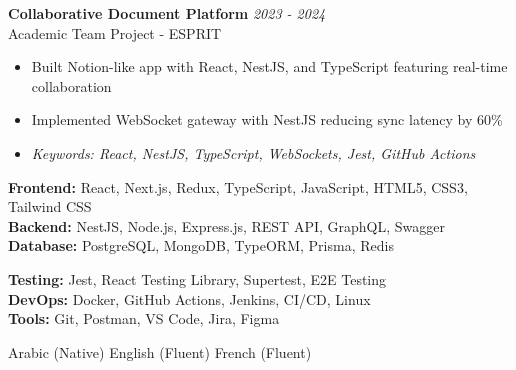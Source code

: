 \documentclass[11pt,a4paper]{article}
\begin{document}

\textbf{Collaborative Document Platform} \hfill \textit{2023 - 2024}\\[-2pt]
Academic Team Project - ESPRIT\\[-5pt]
\begin{itemize}[leftmargin=8pt,itemsep=1pt,topsep=2pt]
  \item Built Notion-like app with React, NestJS, and TypeScript featuring real-time collaboration
  \item Implemented WebSocket gateway with NestJS reducing sync latency by 60\%
  \item[] \textit{\footnotesize Keywords: React, NestJS, TypeScript, WebSockets, Jest, GitHub Actions}
\end{itemize}\vspace{3pt}

{\small
\begin{minipage}[t]{0.48\textwidth}
  \textbf{Frontend:} React, Next.js, Redux, TypeScript, JavaScript, HTML5, CSS3, Tailwind CSS\\[1.5pt]
  \textbf{Backend:} NestJS, Node.js, Express.js, REST API, GraphQL, Swagger\\[1.5pt]
  \textbf{Database:} PostgreSQL, MongoDB, TypeORM, Prisma, Redis
\end{minipage}
\hfill
\begin{minipage}[t]{0.48\textwidth}
  \textbf{Testing:} Jest, React Testing Library, Supertest, E2E Testing\\[1.5pt]
  \textbf{DevOps:} Docker, GitHub Actions, Jenkins, CI/CD, Linux\\[1.5pt]
  \textbf{Tools:} Git, Postman, VS Code, Jira, Figma
\end{minipage}
}

Arabic (Native) \textbar{} English (Fluent) \textbar{} French (Fluent)
\end{document}
